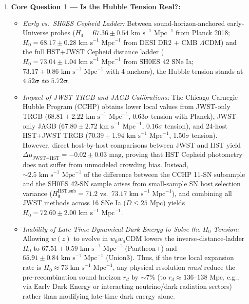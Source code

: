 \documentclass[11pt,letterpaper]{article}
\begin{document}
\begin{enumerate}
    \setlength{\itemsep}{4pt}
    \item \textbf{Core Question 1 --- Is the Hubble Tension Real?:}
    \begin{itemize}
        \setlength{\itemsep}{2pt}
        \item \emph{Early vs.\ SH0ES Cepheid Ladder:} Between sound-horizon-anchored early-Universe probes ($H_0 = 67.36 \pm 0.54\text{ km s}^{-1}\text{ Mpc}^{-1}$ from Planck 2018; $H_0 = 68.17 \pm 0.28\text{ km s}^{-1}\text{ Mpc}^{-1}$ from DESI DR2 + CMB $\Lambda$CDM) and the full HST+JWST Cepheid distance ladder ($H_0 = 73.04 \pm 1.04\text{ km s}^{-1}\text{ Mpc}^{-1}$ from SH0ES 42 SNe Ia; $73.17 \pm 0.86\text{ km s}^{-1}\text{ Mpc}^{-1}$ with 4 anchors), the Hubble tension stands at $\mathbf{4.52}\boldsymbol{\sigma}\textbf{ to }\mathbf{5.72}\boldsymbol{\sigma}$.
        \item \emph{Impact of JWST TRGB and JAGB Calibrations:} The Chicago-Carnegie Hubble Program (CCHP) obtains lower local values from JWST-only TRGB ($68.81 \pm 2.22\text{ km s}^{-1}\text{ Mpc}^{-1}$, $0.63\sigma$ tension with Planck), JWST-only JAGB ($67.80 \pm 2.72\text{ km s}^{-1}\text{ Mpc}^{-1}$, $0.16\sigma$ tension), and 24-host HST+JWST TRGB ($70.39 \pm 1.94\text{ km s}^{-1}\text{ Mpc}^{-1}$, $1.50\sigma$ tension). However, direct host-by-host comparisons between JWST and HST yield $\Delta\mu_{\text{JWST}-\text{HST}} = -0.02 \pm 0.03\text{ mag}$, proving that HST Cepheid photometry does not suffer from unmodeled crowding bias. Instead, $\sim 2.5\text{ km s}^{-1}\text{ Mpc}^{-1}$ of the difference between the CCHP 11-SN subsample and the SH0ES 42-SN sample arises from small-sample SN host selection variance ($H_0^{\text{HST,sub}} = 71.2$ vs.\ $73.17\text{ km s}^{-1}\text{ Mpc}^{-1}$), and combining all JWST methods across 16 SNe Ia ($D \le 25\text{ Mpc}$) yields $H_0 = 72.60 \pm 2.00\text{ km s}^{-1}\text{ Mpc}^{-1}$.
        \item \emph{Inability of Late-Time Dynamical Dark Energy to Solve the $H_0$ Tension:} Allowing $w(z)$ to evolve in $w_0 w_a$CDM lowers the inverse-distance-ladder $H_0$ to $67.51 \pm 0.59\text{ km s}^{-1}\text{ Mpc}^{-1}$ (Pantheon+) and $65.91 \pm 0.84\text{ km s}^{-1}\text{ Mpc}^{-1}$ (Union3). Thus, if the true local expansion rate is $H_0 \approx 73\text{ km s}^{-1}\text{ Mpc}^{-1}$, any physical resolution \emph{must} reduce the pre-recombination sound horizon $r_d$ by $\sim 7\%$ (to $r_d \approx 136\text{--}138\text{ Mpc}$, e.g., via Early Dark Energy or interacting neutrino/dark radiation sectors) rather than modifying late-time dark energy alone.

\end{itemize}
\end{enumerate}
\end{document}
